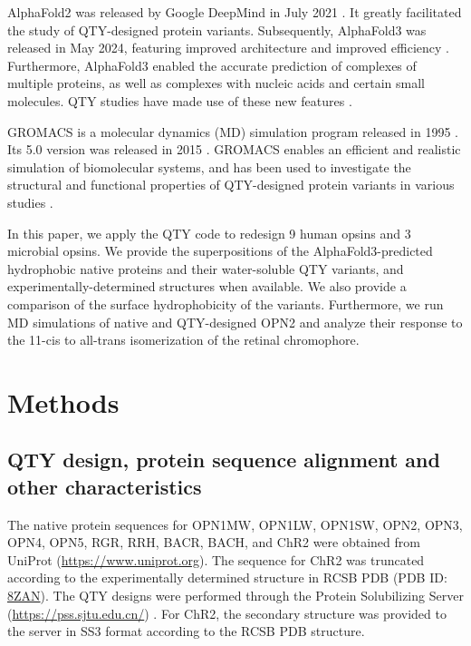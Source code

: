 \documentclass[fleqn, 10pt, lineno]{manuscript}
\begin{document}
AlphaFold2 was released by Google DeepMind in July 2021 \citep{Jumper_2021}. It greatly facilitated the study of QTY-designed protein variants. Subsequently, AlphaFold3 was released in May 2024, featuring improved architecture and improved efficiency \citep{Abramson_2024}. Furthermore, AlphaFold3 enabled the accurate prediction of complexes of multiple proteins, as well as complexes with nucleic acids and certain small molecules. QTY studies have made use of these new features \citep{Chen_2025, Johnsson_2025}. 

GROMACS is a molecular dynamics (MD) simulation program released in 1995 \citep{Berendsen_1995}. Its 5.0 version was released in 2015 \citep{Abraham_2015}. GROMACS enables an efficient and realistic simulation of biomolecular systems, and has been used to investigate the structural and functional properties of QTY-designed protein variants in various studies \citep{Karagol_2024, Li_Tang_2024, Smorodina_2024, Li_Wang_2024, Johnsson_2025}. 

In this paper, we apply the QTY code to redesign 9 human opsins and 3 microbial opsins. We provide the superpositions of the AlphaFold3-predicted hydrophobic native proteins and their water-soluble QTY variants, and experimentally-determined structures when available. We also provide a comparison of the surface hydrophobicity of the variants. Furthermore, we run MD simulations of native and QTY-designed OPN2 and analyze their response to the 11-cis to all-trans isomerization of the retinal chromophore. 

\section*{Methods}

\subsection*{QTY design, protein sequence alignment and other characteristics}

The native protein sequences for OPN1MW, OPN1LW, OPN1SW, OPN2, OPN3, OPN4, OPN5, RGR, RRH, BACR, BACH, and ChR2 were obtained from UniProt (\url{https://www.uniprot.org}). The sequence for ChR2 was truncated according to the experimentally determined structure in RCSB PDB (PDB ID: \href{https://www.rcsb.org/structure/8ZAN}{8ZAN}). The QTY designs were performed through the Protein Solubilizing Server (\url{https://pss.sjtu.edu.cn/}) \citep{Tao_2022}. For ChR2, the secondary structure was provided to the server in SS3 format according to the RCSB PDB structure. 
\end{document}
